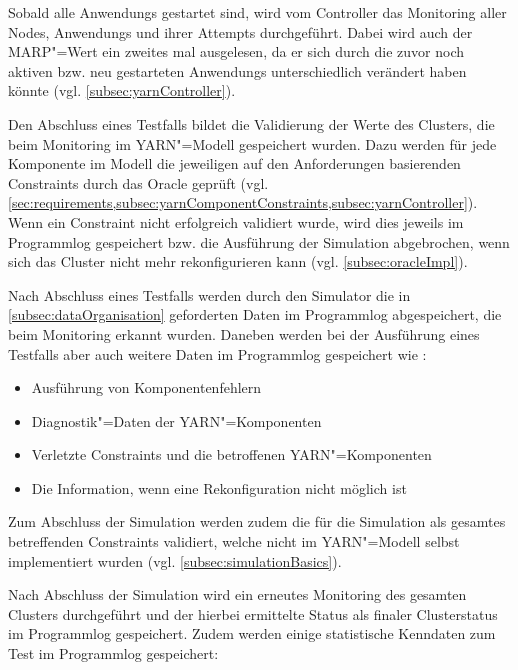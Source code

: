 Sobald alle \glspl{Anwendung} gestartet sind, wird vom Controller das Monitoring aller Nodes, \glspl{Anwendung} und ihrer \glspl{Attempt} durchgeführt.
Dabei wird auch der \gls{MARP}"=Wert ein zweites mal ausgelesen, da er sich durch die zuvor noch aktiven bzw. neu gestarteten \glspl{Anwendung} unterschiedlich verändert haben könnte (vgl. \cref{subsec:yarnController}).

Den Abschluss eines Testfalls bildet die Validierung der Werte des Clusters, die beim Monitoring im \gls{YARN}"=Modell gespeichert wurden.
Dazu werden für jede Komponente im Modell die jeweiligen auf den Anforderungen basierenden Constraints durch das Oracle geprüft (vgl. \cref{sec:requirements,subsec:yarnComponentConstraints,subsec:yarnController}).
Wenn ein Constraint nicht erfolgreich validiert wurde, wird dies jeweils im Programmlog gespeichert bzw. die Ausführung der Simulation abgebrochen, wenn sich das Cluster nicht mehr rekonfigurieren kann (vgl. \cref{subsec:oracleImpl}).

Nach Abschluss eines Testfalls werden durch den Simulator die in \cref{subsec:dataOrganisation} geforderten Daten im Programmlog abgespeichert, die beim Monitoring erkannt wurden.
Daneben werden bei der Ausführung eines Testfalls aber auch weitere Daten im Programmlog gespeichert wie \zB:

\begin{itemize}
    \item Ausführung von Komponentenfehlern
    \item Diagnostik"=Daten der \gls{YARN}"=Komponenten
    \item Verletzte Constraints und die betroffenen \gls{YARN}"=Komponenten
    \item Die Information, wenn eine Rekonfiguration nicht möglich ist
\end{itemize}

Zum Abschluss der Simulation werden zudem die für die Simulation als gesamtes betreffenden Constraints validiert, welche nicht im \gls{YARN}"=Modell selbst implementiert wurden (vgl. \cref{subsec:simulationBasics}).

Nach Abschluss der Simulation wird ein erneutes Monitoring des gesamten Clusters durchgeführt und der hierbei ermittelte Status als finaler Clusterstatus im Programmlog gespeichert.
Zudem werden einige statistische Kenndaten zum \gls{Test} im Programmlog gespeichert:

